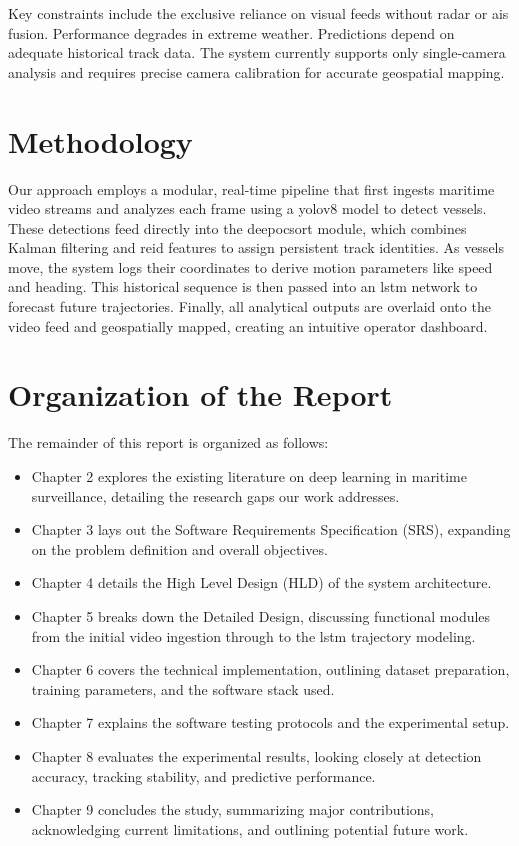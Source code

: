 Key constraints include the exclusive reliance on visual feeds without radar or \gls{ais} fusion. Performance degrades in extreme weather. Predictions depend on adequate historical track data. The system currently supports only single-camera analysis and requires precise camera calibration for accurate geospatial mapping.

\section{Methodology}
Our approach employs a modular, real-time pipeline that first ingests maritime video streams and analyzes each frame using a \gls{yolov8} model to detect vessels. These detections feed directly into the \gls{deepocsort} module, which combines Kalman filtering and \gls{reid} features to assign persistent track identities. As vessels move, the system logs their coordinates to derive motion parameters like speed and heading. This historical sequence is then passed into an \gls{lstm} network to forecast future trajectories. Finally, all analytical outputs are overlaid onto the video feed and geospatially mapped, creating an intuitive operator dashboard.

\section{Organization of the Report}
The remainder of this report is organized as follows:
\begin{itemize}
\item Chapter 2 explores the existing literature on deep learning in maritime surveillance, detailing the research gaps our work addresses.
\item Chapter 3 lays out the Software Requirements Specification (SRS), expanding on the problem definition and overall objectives.
\item Chapter 4 details the High Level Design (HLD) of the system architecture.
\item Chapter 5 breaks down the Detailed Design, discussing functional modules from the initial video ingestion through to the \gls{lstm} trajectory modeling.
\item Chapter 6 covers the technical implementation, outlining dataset preparation, training parameters, and the software stack used.
\item Chapter 7 explains the software testing protocols and the experimental setup.
\item Chapter 8 evaluates the experimental results, looking closely at detection accuracy, tracking stability, and predictive performance.
\item Chapter 9 concludes the study, summarizing major contributions, acknowledging current limitations, and outlining potential future work.
\end{itemize}
